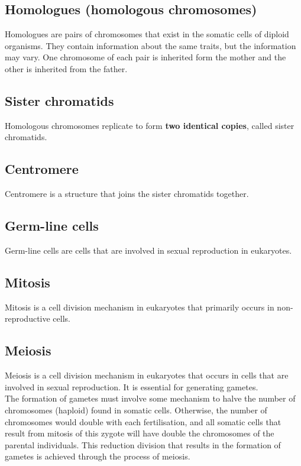 \documentclass[11pt]{article}
\begin{document}
\subsection{Homologues (homologous chromosomes)}
\label{sec:org4d6f2c3}
Homologues are pairs of chromosomes that exist in the somatic cells of diploid organisms. They contain information about the same traits, but the information may vary. One chromosome of each pair is inherited form the mother and the other is inherited from the father.

\subsection{Sister chromatids}
\label{sec:org14560d4}
Homologous chromosomes replicate to form \textbf{two identical copies}, called sister chromatids.

\subsection{Centromere}
\label{sec:org48654b9}
Centromere is a structure that joins the sister chromatids together.

\subsection{Germ-line cells}
\label{sec:orgd462ccf}
Germ-line cells are cells that are involved in sexual reproduction in eukaryotes.

\subsection{Mitosis}
\label{sec:org50f913e}
Mitosis is a cell division mechanism in eukaryotes that primarily occurs in non-reproductive cells.

\subsection{Meiosis}
\label{sec:orgc22336f}
Meiosis is a cell division mechanism in eukaryotes that occurs in cells that are involved in sexual reproduction. It is essential for generating gametes.
\\[0pt]

The formation of gametes must involve some mechanism to halve the number of chromosomes (haploid) found in somatic cells. Otherwise, the number of chromosomes would double with each fertilisation, and all somatic cells that result from mitosis of this zygote will have double the chromosomes of the parental individuals. This reduction division that results in the formation of gametes is achieved through the process of meiosis.
\end{document}
